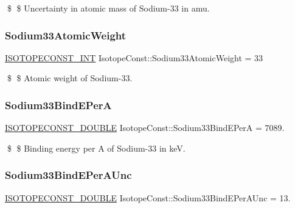 \$ \$ Uncertainty in atomic mass of Sodium-\/33 in amu. \mbox{\label{group___isotope_const-_sodium-_na33_ga690d1d40e51186d5faa033a16bd65a75}} 
\subsubsection{\texorpdfstring{Sodium33\+Atomic\+Weight}{Sodium33AtomicWeight}}
{\footnotesize\ttfamily \mbox{\hyperlink{group___isotope_const-_macros_ga5f18360b3e99483a35c32d789e62621c}{I\+S\+O\+T\+O\+P\+E\+C\+O\+N\+S\+T\+\_\+\+I\+NT}} Isotope\+Const\+::\+Sodium33\+Atomic\+Weight = 33}

\$ \$ Atomic weight of Sodium-\/33. \mbox{\label{group___isotope_const-_sodium-_na33_gaaa0740ded57a08c3c105912612520bd7}} 
\subsubsection{\texorpdfstring{Sodium33\+Bind\+E\+PerA}{Sodium33BindEPerA}}
{\footnotesize\ttfamily \mbox{\hyperlink{group___isotope_const-_macros_ga8f45a7272ce02c0b4c65c44636ed719a}{I\+S\+O\+T\+O\+P\+E\+C\+O\+N\+S\+T\+\_\+\+D\+O\+U\+B\+LE}} Isotope\+Const\+::\+Sodium33\+Bind\+E\+PerA = 7089.}

\$ \$ Binding energy per A of Sodium-\/33 in keV. \mbox{\label{group___isotope_const-_sodium-_na33_gaf513116d9ce2f61fe145ff3d299e3012}} 
\subsubsection{\texorpdfstring{Sodium33\+Bind\+E\+Per\+A\+Unc}{Sodium33BindEPerAUnc}}
{\footnotesize\ttfamily \mbox{\hyperlink{group___isotope_const-_macros_ga8f45a7272ce02c0b4c65c44636ed719a}{I\+S\+O\+T\+O\+P\+E\+C\+O\+N\+S\+T\+\_\+\+D\+O\+U\+B\+LE}} Isotope\+Const\+::\+Sodium33\+Bind\+E\+Per\+A\+Unc = 13.}

